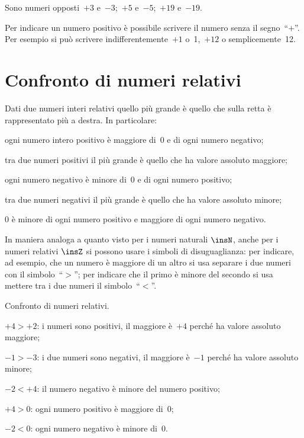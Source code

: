 Sono numeri opposti~$+3$ e~$-3$;~$+5$ e~$-5$;~$+19$ e~$-19$.

\osservazione Per indicare un numero positivo è possibile scrivere il numero senza il segno~``$+$''.
Per esempio si può scrivere indifferentemente~$+1$ o~1,~$+12$ o semplicemente~12.

\section{Confronto di numeri relativi}

Dati due numeri interi relativi quello più grande è quello che sulla retta è rappresentato più a destra.
In particolare:
 \begin{enumeratea}
 \item ogni numero intero positivo è maggiore di~0 e di ogni numero negativo;
 \item tra due numeri positivi il più grande è quello che ha valore assoluto maggiore;
 \item ogni numero negativo è minore di~0 e di ogni numero positivo;
 \item tra due numeri negativi il più grande è quello che ha valore assoluto minore;
 \item 0 è minore di ogni numero positivo e maggiore di ogni numero negativo.
 \end{enumeratea}

In maniera analoga a quanto visto per i numeri naturali $\insN$, anche per i numeri relativi $\insZ$ si possono usare i simboli di disuguaglianza: per indicare, ad esempio, che un numero è maggiore di un altro si usa separare i due numeri con il
simbolo~``$>$''; per indicare che il primo è minore del secondo si usa mettere tra i due numeri il simbolo~``$<$''.

\begin{exrig}
 \begin{esempio}
 Confronto di numeri relativi.
 \begin{itemize*}
 \item $+4>+2$: i numeri sono positivi, il maggiore è~$+4$ perché ha valore assoluto maggiore;
 \item $-1>-3$: i due numeri sono negativi, il maggiore è~$-1$ perché ha valore assoluto minore;
 \item $-2<+4$: il numero negativo è minore del numero positivo;
 \item $+4>0$: ogni numero positivo è maggiore di~0;
 \item $-2<0$: ogni numero negativo è minore di~0.
 \end{itemize*}
 \end{esempio}
\end{exrig}

